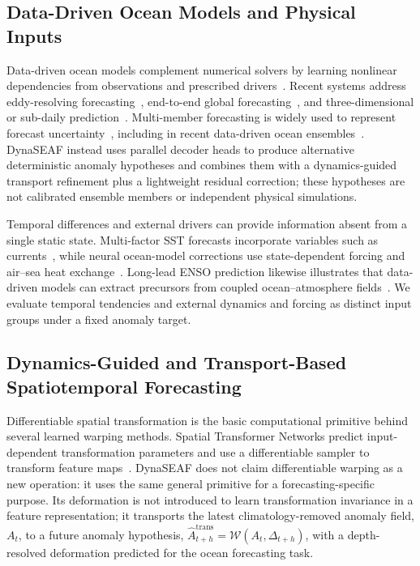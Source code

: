 \documentclass[conference]{IEEEtran}
\begin{document}
\subsection{Data-Driven Ocean Models and Physical Inputs}
Data-driven ocean models complement numerical solvers by learning nonlinear dependencies from observations and prescribed drivers~\cite{boninoMachineLearningMethods2024,zhaoDeepLearningOcean2024}. Recent systems address eddy-resolving forecasting~\cite{cuiWenHaiForecastingEddying2025}, end-to-end global forecasting~\cite{elAouniGLONETMercatorEndtoEnd2024}, and three-dimensional or sub-daily prediction~\cite{huangFuXiOceanGlobalOcean2025,wuAxiomOceanForecastingThreeDimensional2026}. Multi-member forecasting is widely used to represent forecast uncertainty~\cite{molteni1996ecmwf}, including in recent data-driven ocean ensembles~\cite{huangFuXiONSDataDrivenEnsemble2026}. DynaSEAF instead uses parallel decoder heads to produce alternative deterministic anomaly hypotheses and combines them with a dynamics-guided transport refinement plus a lightweight residual correction; these hypotheses are not calibrated ensemble members or independent physical simulations.

Temporal differences and external drivers can provide information absent from a single static state. Multi-factor SST forecasts incorporate variables such as currents~\cite{yangMultiFactorDeepLearning2025}, while neural ocean-model corrections use state-dependent forcing and air--sea heat exchange~\cite{stortoCorrectionSeaSurface2025}. Long-lead ENSO prediction likewise illustrates that data-driven models can extract precursors from coupled ocean--atmosphere fields~\cite{hamDeepLearningMultiyear2019}. We evaluate temporal tendencies and external dynamics and forcing as distinct input groups under a fixed anomaly target.

\subsection{Dynamics-Guided and Transport-Based Spatiotemporal Forecasting}
Differentiable spatial transformation is the basic computational primitive behind several learned warping methods. Spatial Transformer Networks predict input-dependent transformation parameters and use a differentiable sampler to transform feature maps~\cite{jaderberg2015spatial}. DynaSEAF does not claim differentiable warping as a new operation: it uses the same general primitive for a forecasting-specific purpose. Its deformation is not introduced to learn transformation invariance in a feature representation; it transports the latest climatology-removed anomaly field, $A_t$, to a future anomaly hypothesis, $\widehat{A}^{\mathrm{trans}}_{t+h}=\mathcal{W}(A_t,\Delta_{t+h})$, with a depth-resolved deformation predicted for the ocean forecasting task.
\end{document}
